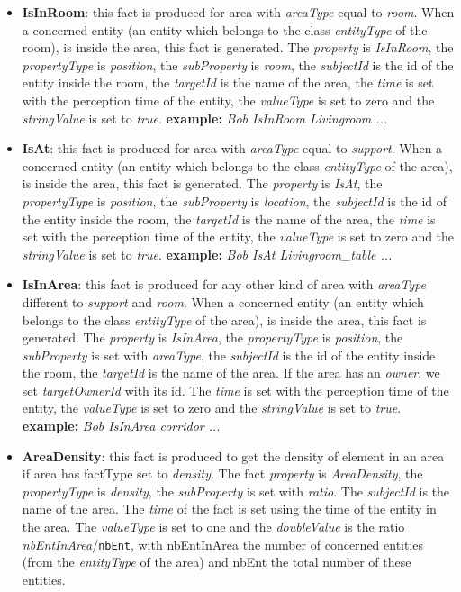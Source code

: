 \documentclass[a4paper]{article}
\begin{document}
\begin{itemize}
\item \textbf{IsInRoom}: this fact is produced for area with \textit{areaType} equal to \textit{room}. When a concerned entity (an entity which belongs to the class \textit{entityType} of the room), is inside the area, this fact is generated. The \textit{property} is \textit{IsInRoom}, the \textit{propertyType} is \textit{position}, the \textit{subProperty} is \textit{room}, the \textit{subjectId} is the id of the entity inside the room, the \textit{targetId} is the name of the area, the \textit{time} is set with the perception time of the entity, the \textit{valueType} is set to zero and the \textit{stringValue} is set to \textit{true}.
\textbf{example:} \textit{Bob IsInRoom Livingroom ...}

\item \textbf{IsAt}: this fact is produced for area with \textit{areaType} equal to \textit{support}. When a concerned entity (an entity which belongs to the class \textit{entityType} of the area), is inside the area, this fact is generated. The \textit{property} is \textit{IsAt}, the \textit{propertyType} is \textit{position}, the \textit{subProperty} is \textit{location}, the \textit{subjectId} is the id of the entity inside the room, the \textit{targetId} is the name of the area, the \textit{time} is set with the perception time of the entity, the \textit{valueType} is set to zero and the \textit{stringValue} is set to \textit{true}.
\textbf{example:} \textit{Bob IsAt Livingroom\_table ...}

\item \textbf{IsInArea}: this fact is produced for any other kind of area with \textit{areaType} different to \textit{support} and \textit{room}. When a concerned entity (an entity which belongs to the class \textit{entityType} of the area), is inside the area, this fact is generated. The \textit{property} is \textit{IsInArea}, the \textit{propertyType} is \textit{position}, the \textit{subProperty} is set with \textit{areaType}, the \textit{subjectId} is the id of the entity inside the room, the \textit{targetId} is the name of the area. If the area has an \textit{owner}, we set \textit{targetOwnerId} with its id. The \textit{time} is set with the perception time of the entity, the \textit{valueType} is set to zero and the \textit{stringValue} is set to \textit{true}.
\textbf{example:} \textit{Bob IsInArea corridor ...}

\item \textbf{AreaDensity}: this fact is produced to get the density of element in an area if area has factType set to \textit{density}. The fact \textit{property} is \textit{AreaDensity}, the \textit{propertyType} is \textit{density}, the \textit{subProperty} is set with \textit{ratio}. The \textit{subjectId} is the name of the area. The \textit{time} of the fact is set using the time of the entity in the area. The \textit{valueType} is set to one and the \textit{doubleValue} is the ratio \textit{nbEntInArea}/\texttt{nbEnt}, with nbEntInArea the number of concerned entities (from the \textit{entityType} of the area) and nbEnt the total number of these entities.


\end{itemize}
\end{document}
